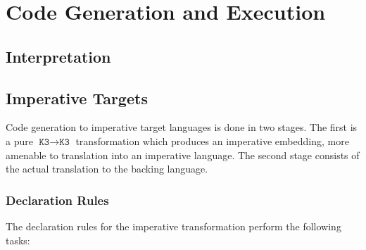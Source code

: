 \documentclass[10pt]{article}
\newcommand{\K}{\ensuremath{\texttt{K3}}}
\begin{document}
\section{Code Generation and Execution}
\subsection{Interpretation}

\subsection{Imperative Targets}

Code generation to imperative target languages is done in two stages. The first is a pure $\K
\rightarrow \K$ transformation which produces an imperative embedding, more amenable to
translation into an imperative language. The second stage consists of the actual translation to
the backing language.

\subsubsection{Declaration Rules}

The declaration rules for the imperative transformation perform the following tasks:
\end{document}
